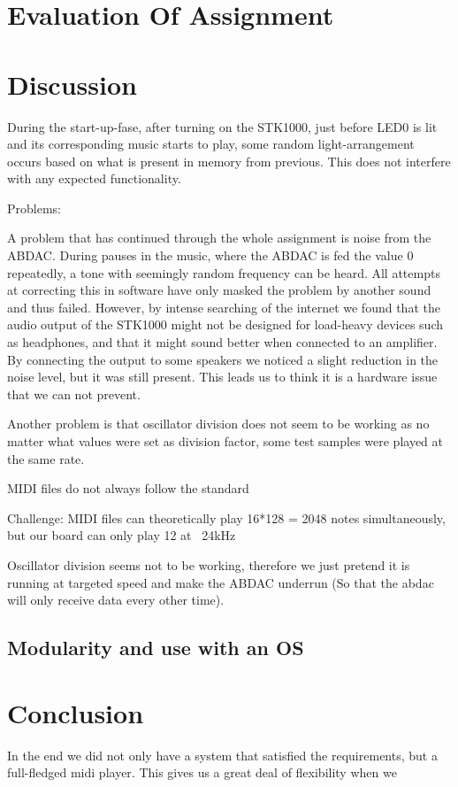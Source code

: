 \documentclass[a4paper,12pt]{article}
\begin{document}
\clearpage
\section{Evaluation Of Assignment}

\clearpage
\section{Discussion}

During the start-up-fase, after turning on the STK1000, just before LED0 is lit and its corresponding music starts to play, some random light-arrangement occurs based on what is present in memory from previous. This does not interfere with any expected functionality.      


Problems:

A problem that has continued through the whole assignment is noise from the ABDAC. During pauses in the music, where the ABDAC is fed the value 0 repeatedly, a tone with seemingly random frequency can be heard. All attempts at correcting this in software have only masked the problem by another sound and thus failed. However, by intense searching of the internet we found that the audio output of the STK1000 might not be designed for load-heavy devices such as headphones, and that it might sound better when connected to an amplifier\cite{impedance}. By connecting the output to some speakers we noticed a slight reduction in the noise level, but it was still present. This leads us to think it is a hardware issue that we can not prevent.

Another problem is that oscillator division does not seem to be working as no matter what values were set as division factor, some test samples were played at the same rate.

MIDI files do not always follow the standard

Challenge: MIDI files can theoretically play 16*128 = 2048 notes simultaneously, but our board can only play 12 at ~24kHz

Oscillator division seems not to be working, therefore we just pretend it is running at targeted speed and make the ABDAC underrun (So that the abdac will only receive data every other time).

\subsection{Modularity and use with an OS}


\clearpage
\section{Conclusion}
In the end we did not only have a system that satisfied the requirements, but a full-fledged midi player. This gives us a great deal of flexibility when we 
\clearpage
\end{document}
